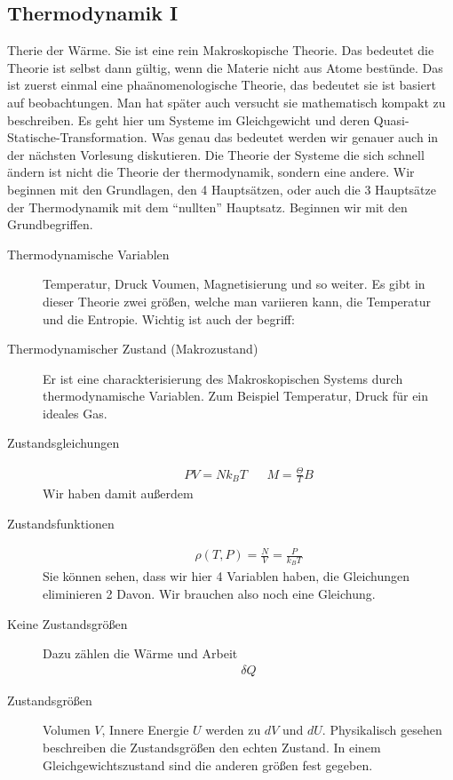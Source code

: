 \subsection*{Thermodynamik I}
Therie der W\"arme. Sie ist eine rein Makroskopische Theorie. Das bedeutet die
Theorie ist selbst dann g\"ultig, wenn die Materie nicht aus Atome best\"unde.
Das ist zuerst einmal eine pha\"anomenologische Theorie, das bedeutet sie ist
basiert auf beobachtungen. Man hat sp\"ater auch versucht sie mathematisch
kompakt zu beschreiben. Es geht hier um Systeme im Gleichgewicht und deren
Quasi-Statische-Transformation. Was genau das bedeutet werden wir genauer auch
in der n\"achsten Vorlesung diskutieren. Die Theorie der Systeme die sich
schnell \"andern ist nicht die Theorie der thermodynamik, sondern eine andere.
Wir beginnen mit den Grundlagen, den 4 Haupts\"atzen, oder auch die 3
Haupts\"atze der Thermodynamik mit dem ``nullten'' Hauptsatz.  Beginnen wir mit
den Grundbegriffen.  
\begin{description} \item[Thermodynamische Variablen] Temperatur, Druck Voumen,
      Magnetisierung und so weiter. Es gibt in dieser Theorie zwei gr\"o\ss{}en,
      welche man variieren kann, die Temperatur und die Entropie. Wichtig
      ist auch der begriff:
    \item[Thermodynamischer Zustand (Makrozustand)]
      Er ist eine charackterisierung des Makroskopischen Systems durch 
      thermodynamische Variablen. Zum Beispiel
      Temperatur, Druck f\"ur ein ideales Gas.
    \item[Zustandsgleichungen] 
      \begin{align*}
        PV = N k_B T &&
        M = \frac{\Theta}{T} B
      \end{align*}
      Wir haben damit au\ss{}erdem
    \item[Zustandsfunktionen] 
      \begin{align*}
        \rho(T, P) = \frac{N}{V} = \frac{P}{k_B T}
      \end{align*}
      Sie k\"onnen sehen, dass wir hier 4 Variablen haben, die Gleichungen
      eliminieren 2 Davon. Wir brauchen also noch eine Gleichung.
      
    \item[Keine Zustandsgr\"o\ss{}en] Dazu z\"ahlen 
      die W\"arme und Arbeit
      \begin{align*}
        \delta{Q}
      \end{align*}
    \item[Zustandsgr\"o\ss{}en] Volumen $V$, Innere Energie $U$
      werden zu $dV$ und $dU$.
      Physikalisch gesehen beschreiben die Zustandsgr\"o\ss{}en den 
      echten Zustand. In einem Gleichgewichtszustand sind die anderen gr\"o\ss{}en
      fest gegeben.
\end{description} 

